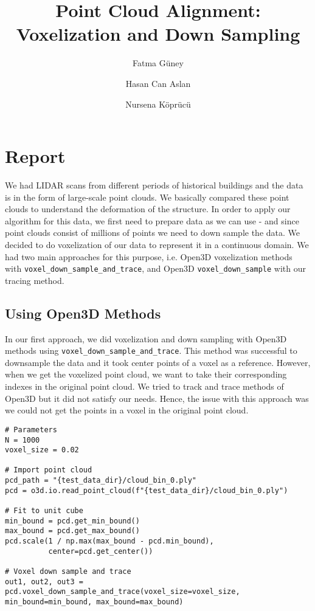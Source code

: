 \documentclass[a4paper]{article}
\author{Fatma Güney}
\author{Hasan Can Aslan}
\author{Nursena Köprücü}
\affil{Department of Computer Engineering, Koç University}
\title{Point Cloud Alignment: Voxelization and Down Sampling}
\date{\projectDate}
\begin{document}
\lstset{language=Python}
\pagestyle{fancy}
\fancyhf{}
\chead{\projectTitle}
\lfoot{\nouppercase{\leftmark}}
\thispagestyle{fancy}
\renewcommand{\headrulewidth}{0.4pt}
\renewcommand{\footrulewidth}{0.4pt}

\maketitle
\thispagestyle{empty}

\section{Report}

We had LIDAR scans from different periods of historical buildings and the data is in the form of large-scale point clouds. We basically compared these point clouds to understand the deformation of the structure. In order to apply our algorithm for this data, we first need to prepare data as we can use - and since point clouds consist of millions of points we need to down sample the data. We decided to do voxelization of our data to represent it in a continuous domain. We had two main approaches for this purpose, i.e. Open3D\cite{Zhou2018} voxelization methods with \texttt{voxel\_down\_sample\_and\_trace}, and Open3D\cite{Zhou2018}  \texttt{voxel\_down\_sample} with our tracing method.

\subsection{Using Open3D Methods}
In our first approach, we did voxelization and down sampling with Open3D\cite{Zhou2018} methods using \texttt{voxel\_down\_sample\_and\_trace}. This method was successful to downsample the data and it took center points of a voxel as a reference. However, when we get the voxelized point cloud, we want to take their corresponding indexes in the original point cloud. We tried to track and trace methods of Open3D\cite{Zhou2018} but it did not satisfy our needs. Hence, the issue with this approach was we could not get the points in a voxel in the original point cloud. 

\begin{lstlisting}[caption={Voxel down sampling with our test data using \texttt{voxel\_down\_sample\_and\_trace}.}]
# Parameters
N = 1000
voxel_size = 0.02

# Import point cloud
pcd_path = "{test_data_dir}/cloud_bin_0.ply"
pcd = o3d.io.read_point_cloud(f"{test_data_dir}/cloud_bin_0.ply")

# Fit to unit cube
min_bound = pcd.get_min_bound()
max_bound = pcd.get_max_bound()
pcd.scale(1 / np.max(max_bound - pcd.min_bound),
          center=pcd.get_center())

# Voxel down sample and trace
out1, out2, out3 = pcd.voxel_down_sample_and_trace(voxel_size=voxel_size, min_bound=min_bound, max_bound=max_bound)
\end{lstlisting}
\end{document}
